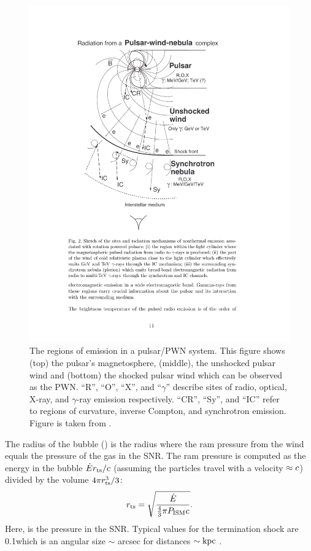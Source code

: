 \begin{figure}[htbp]
  \centering
    \includegraphics{chapters/pulsar_pwn_system/figures/termination_shock.pdf}
  \caption{The regions of emission in a pulsar/\ac{PWN} system. 
  This figure shows (top) the pulsar's magnetosphere, (middle), the
  unshocked pulsar wind and (bottom) the shocked pulsar wind which can
  be observed as the \ac{PWN}.
  ``R'', ``O'', ``X'', and ``$\gamma$'' describe sites of radio, optical, X-ray, and
  $\gamma$-ray emission respectively.
  ``CR'', ``Sy'', and ``IC'' refer to regions of curvature, inverse Compton, and
  synchrotron emission.
  Figure is taken from \cite{aharonian_2003_exploring-physics}.
  }
\end{figure}

The radius of the bubble (\radiusterminationshock) is the radius
where the ram pressure from the wind equals the pressure of the gas
in the \ac{SNR}.  The ram pressure is computed as the energy in the
bubble $\dot{E} r_\text{ts}/c$ (assuming the particles
travel with a velocity $\approx c$) divided by the volume
$4\pi r_\text{ts}^3/3$:
\begin{equation}
  r_\text{ts} = \sqrt{\frac{\dot{E}}{\tfrac{4}{3}\pi P_\text{ISM} c}}.
\end{equation}
Here, \pressureISM is the pressure in the SNR.  Typical values
for the termination shock are 0.1\unitspace\parsec which is an
angular size $\sim$ \ac{arcsec} for distances $\sim\text{k}\text{pc}$
\citep{gaensler_2006_evolution-structure}.

